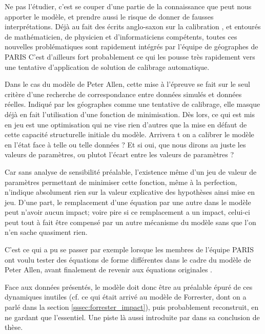 Ne pas l'étudier, c'est se couper d'une partie de la connaissance que peut nous apporter le modèle, et prendre aussi le risque de donner de fausses interprétations. Déjà au fait des écrits anglo-saxon sur la calibration \autocite{Batty1976}, et entourés de mathématicien, de physicien et d'informaticiens compétents, toutes ces nouvelles problématiques sont rapidement intégrés par l'équipe de géographes de PARIS \autocites{Sanders1984, Sanders1985, Pumain1989} C'est d'ailleurs fort probablement ce qui les pousse très rapidement vers une tentative d'application de solution de calibrage automatique.

Dans le cas du modèle de Peter Allen, cette mise à l'épreuve se fait sur le seul critère d'une recherche de correspondance entre données simulés et données réelles. Indiqué par les géographes comme une tentative de calibrage, elle masque déjà en fait l'utilisation d'une fonction de minimisation. Dès lors, ce qui est mis en jeu est une optimisation qui ne vise rien d'autres que la mise en défaut de cette capacité structurelle initiale du modèle. Arrivera t on a calibrer le modèle en l'état face à telle ou telle données ? Et si oui, que nous dirons au juste les valeurs de paramètres, ou plutot l'écart entre les valeurs de paramètres ?

Car sans analyse de sensibilité préalable, l'existence même d'un jeu de valeur de paramètres permettant de minimiser cette fonction, même à la perfection, n'indique absolument rien sur la valeur explicative des hypothèses ainsi mise en jeu. D'une part, le remplacement d'une équation par une autre dans le modèle peut n'avoir aucun impact; voire pire si ce remplacement a un impact, celui-ci peut tout à fait être compensé par un autre mécanisme du modèle sans que l'on n'en sache quasiment rien.

C'est ce qui a pu se passer par exemple lorsque les membres de l'équipe PARIS ont voulu tester des équations de forme différentes dans le cadre du modèle de Peter Allen, avant finalement de revenir aux équations originales \autocites{Sanders1984}[147]{Pumain1989}.

Face aux données présentés, le modèle doit donc être au préalable épuré de ces dynamiques inutiles (cf. ce qui était arrivé au modèle de Forrester, dont on a parlé dans la section \ref{sssec:forrester_impact}), puis probablement reconstruit, en ne gardant que l'essentiel. Une piste là aussi introduite par \textcite{Sanders1984} dans sa conclusion de thèse.

